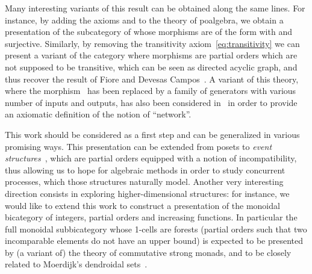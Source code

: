 \documentclass[submission,copyright,creativecommons]{eptcs}
\theoremstyle{definition}
\theoremstyle{remark}
\begin{document}
Many interesting variants of this result can be obtained along the same
lines. For instance, by adding the axioms 
and  to the theory of poalgebra, we obtain a presentation
of the subcategory of  whose morphisms are of the form  with 
and  surjective. Similarly, by removing the transitivity
axiom~\eqref{eq:transitivity} we can present a variant of the category where
morphisms are partial orders which are not supposed to be transitive, which can
be seen as directed acyclic graph, and thus recover the result of Fiore and
Devesas Campos~\cite{fiore2013algebra}. A variant of this theory, where the
morphism~ has been replaced by a family of generators with various
number of inputs and outputs, has also been considered in~\cite{beauxis2011non}
in order to provide an axiomatic definition of the notion of ``network''.

This work should be considered as a first step and can be generalized in various
promising ways. This presentation can be extended from posets to \emph{event
  structures}~\cite{winskel1995models}, which are partial orders equipped with a
notion of incompatibility, thus allowing us to hope for algebraic methods in
order to study concurrent processes, which those structures naturally
model. Another very interesting direction consists in exploring
higher-dimensional structures: for instance, we would like to extend this work
to construct a presentation of the monoidal bicategory of integers, partial
orders and increasing functions. In particular the full monoidal subbicategory
whose 1-cells are forests (\ie partial orders such that two incomparable
elements do not have an upper bound) is expected to be presented by (a variant
of) the theory of commutative strong monads, and to be closely related to
Moerdijk's dendroidal sets~\cite{moerdijk2010dendroidal}.



\end{document}
